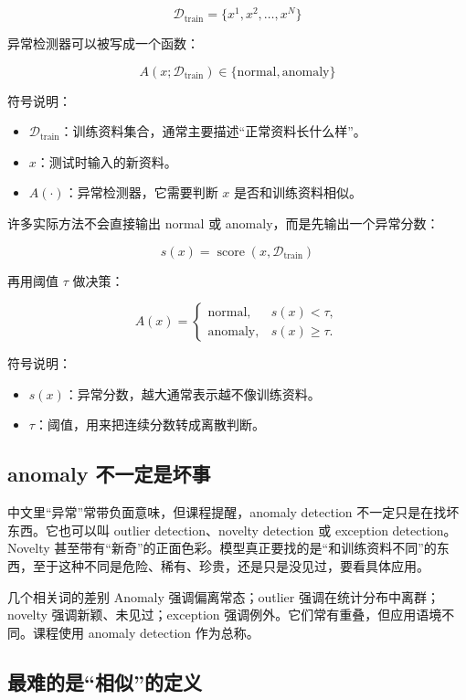 \documentclass[a4paper]{article}
\begin{document}
\[
\mathcal{D}_{\mathrm{train}}=\{x^1,x^2,\ldots,x^N\}
\]

异常检测器可以被写成一个函数：

\[
A(x;\mathcal{D}_{\mathrm{train}})\in\{\mathrm{normal},\mathrm{anomaly}\}
\]

符号说明：
\begin{itemize}
    \item $\mathcal{D}_{\mathrm{train}}$：训练资料集合，通常主要描述“正常资料长什么样”。
    \item $x$：测试时输入的新资料。
    \item $A(\cdot)$：异常检测器，它需要判断 $x$ 是否和训练资料相似。
\end{itemize}

许多实际方法不会直接输出 normal 或 anomaly，而是先输出一个异常分数：

\[
s(x)=\operatorname{score}(x,\mathcal{D}_{\mathrm{train}})
\]

再用阈值 $\tau$ 做决策：

\[
A(x)=
\begin{cases}
\mathrm{normal}, & s(x)<\tau,\\
\mathrm{anomaly}, & s(x)\ge \tau.
\end{cases}
\]

符号说明：
\begin{itemize}
    \item $s(x)$：异常分数，越大通常表示越不像训练资料。
    \item $\tau$：阈值，用来把连续分数转成离散判断。
\end{itemize}

\subsection{anomaly 不一定是坏事}

中文里“异常”常带负面意味，但课程提醒，anomaly detection 不一定只是在找坏东西。它也可以叫 outlier detection、novelty detection 或 exception detection。Novelty 甚至带有“新奇”的正面色彩。模型真正要找的是“和训练资料不同”的东西，至于这种不同是危险、稀有、珍贵，还是只是没见过，要看具体应用。

\begin{knowledgebox}{几个相关词的差别}
    Anomaly 强调偏离常态；outlier 强调在统计分布中离群；novelty 强调新颖、未见过；exception 强调例外。它们常有重叠，但应用语境不同。课程使用 anomaly detection 作为总称。
\end{knowledgebox}

\subsection{最难的是“相似”的定义}
\end{document}
